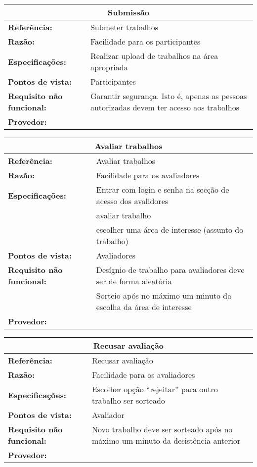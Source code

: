 \documentclass[letter]{article}
\begin{document}
%
\begin{table}[h!]\begin{center}
\begin{tabular}{|ll|}
\hline 
\multicolumn{2}{|c|}{\textbf{Submissão}}\tabularnewline
\hline
\textbf{Referência:} & Submeter trabalhos\tabularnewline
\textbf{Razão:} & Facilidade para os participantes\tabularnewline
\textbf{Especificações:} & Realizar upload de trabalhos na área apropriada\tabularnewline
\textbf{Pontos de vista:} & Participantes\tabularnewline
\textbf{Requisito não funcional:} & Garantir segurança. Isto é, apenas as pessoas autorizadas devem ter
acesso aos trabalhos\tabularnewline
\textbf{Provedor:} & \tabularnewline
\hline\end{tabular}\end{center}
\end{table}


%
\begin{table}[h!]\begin{center}
\begin{tabular}{|ll|}
\hline 
\multicolumn{2}{|c|}{\textbf{Avaliar trabalhos}}\tabularnewline
\hline
\textbf{Referência:} & Avaliar trabalhos\tabularnewline
\textbf{Razão:} & Facilidade para os avaliadores\tabularnewline
\textbf{Especificações:} & Entrar com login e senha na secção de acesso dos avalidores\tabularnewline
 & avaliar trabalho\tabularnewline
 &  escolher uma área de interesse (assunto do trabalho)\tabularnewline
\textbf{Pontos de vista:} & Avaliadores\tabularnewline
\textbf{Requisito não funcional:} & Desígnio de trabalho para avaliadores deve ser de forma aleatória\tabularnewline
 & Sorteio após no máximo um minuto da escolha da área de interesse\tabularnewline
\textbf{Provedor:} & \tabularnewline
\hline\end{tabular}\end{center}
\end{table}


%
\begin{table}[h!]\begin{center}
\begin{tabular}{|ll|}
\hline 
\multicolumn{2}{|c|}{\textbf{Recusar avaliação}}\tabularnewline
\hline
\textbf{Referência:} & Recusar avaliação\tabularnewline
\textbf{Razão:} & Facilidade para os avaliadores\tabularnewline
\textbf{Especificações:} & Escolher opção \textquotedblleft{}rejeitar\textquotedblright{} para
outro trabalho ser sorteado\tabularnewline
\textbf{Pontos de vista:} & Avaliador\tabularnewline
\textbf{Requisito não funcional:} & Novo trabalho deve ser sorteado após no máximo um minuto da desistência
anterior\tabularnewline
\textbf{Provedor:} & \tabularnewline
\hline\end{tabular}\end{center}
\end{table}
\end{document}
